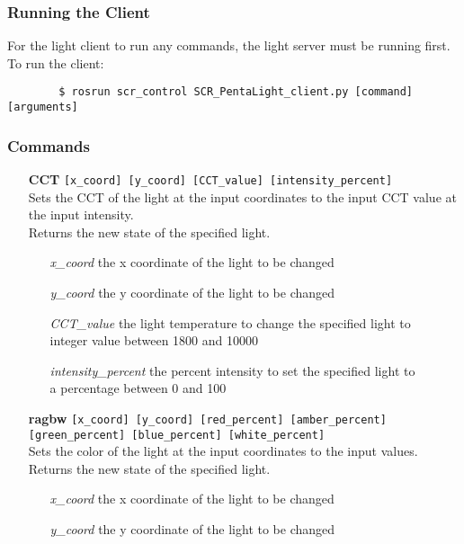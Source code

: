 \documentclass[twoside]{article}
\begin{document}
	\subsubsection{Running the Client}
	For the light client to run any commands, the light server must be running first.\\
	To run the client:
	\begin{verbatim}
	    $ rosrun scr_control SCR_PentaLight_client.py [command] [arguments]
	\end{verbatim}
	\subsubsection{Commands}
	\begin{enumerate}
		\item[\bf CCT] \verb|[x_coord] [y_coord] [CCT_value] [intensity_percent]|\\
		Sets the CCT of the light at the input coordinates to the input CCT value at the input intensity.\\
		Returns the new state of the specified light.
		\begin{enumerate}[leftmargin=3\parindent]
			\item[{\it x\_coord}] the x coordinate of the light to be changed
			\item[{\it y\_coord}] the y coordinate of the light to be changed
			\item[{\it CCT\_value}] the light temperature to change the specified light to\\
			integer value between 1800 and 10000
			\item[{\it intensity\_percent}] the percent intensity to set the specified light to\\
			a percentage between 0 and 100
		\end{enumerate}
		\item[\bf ragbw] \verb|[x_coord] [y_coord] [red_percent] [amber_percent]|\\
						 \verb|[green_percent] [blue_percent] [white_percent]|\\
		Sets the color of the light at the input coordinates to the input values.\\
		Returns the new state of the specified light.
		\begin{enumerate}[leftmargin=3\parindent]
			\item[{\it x\_coord}] the x coordinate of the light to be changed
			\item[{\it y\_coord}] the y coordinate of the light to be changed

\end{enumerate}
\end{enumerate}
\end{document}
